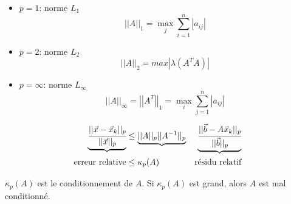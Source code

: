 \begin{itemize}
    \item $p=1$: norme $L_1$ 
    $$\left||A|\right|_1 = \max_{j} \sum_{i=1}^n \left|a_{ij}\right|$$
    \item $p=2$: norme $L_2$ 
    $$\left||A|\right|_2 = max |\lambda(A^TA)|$$
    \item $p=\infty$: norme $L_\infty$ 
    $$\left||A|\right|_\infty = \left||A^T|\right|_1 =\max_{i} \sum_{j=1}^n \left|a_{ij}\right|$$
\end{itemize}


\begin{align*}
    \underbrace{\cfrac{||\vec{x} - \vec{x}_k||_p}{||\vec{x}||_p}} &\leq \underbrace{ ||A||_p ||A^{-1}||_p} & \underbrace{\cfrac{||\vec{b} - A\vec{x}_{k}||_p}{||\vec{b}||_p}} \\
    \text{erreur relative} & \leq \kappa_p(A)  & \text{résidu relatif}
\end{align*}

$\kappa_p(A)$ est le conditionnement de $A$.
Si $\kappa_p(A)$ est grand, alors $A$ est mal conditionné.

